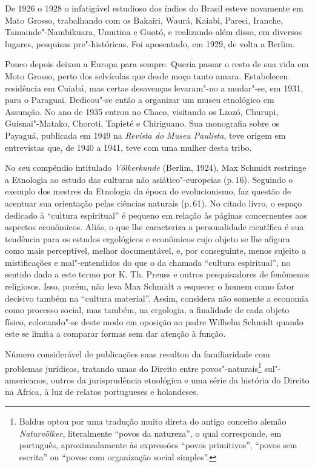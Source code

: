 {De 1926 o 1928 o infatigável estudioso dos índios do Brasil esteve
novamente em Mato Grosso, trabalhando com os Bakairi, Waurá, Kaiabi,
Pareci, Iranche, Tamainde"-Nambikuara, Umutina e Guotó, e realizando além
disso, em diversos lugares, pesquisas pre"-históricas. Foi aposentado, em
1929, de volta a Berlim.

Pouco depois deixou a Europa para sempre. Queria passar o resto de sua
vida em Moto Grosso, perto dos selvícolas que desde moço tanto amara.
Estabeleceu residência em Cuiabá, mas certas desavenças levaram"-no a
mudar"-se, em 1931, para o Paraguai. Dedicou"-se então a organizar um
museu etnológico em Assunção. No ano de 1935 entrou no Chaco, visitando
os Lzozó, Churupi, Guisnai"-Matako, Choroti, Tapieté e Chiriguano. Sua
monografia sobre os Payaguá, publicada em 1949 na \textit{Revista do Museu
Paulista}, teve origem em entrevistas que, de 1940 a 1941, teve com uma
mulher desta tribo.


No seu compêndio intitulado \textit{Völkerkunde} (Berlim, 1924), Max
Schmidt restringe a Etnologia ao estudo das culturas não
asiático"-europeias (p.\,16). Seguindo o exemplo dos mestres da Etnologia
da época do evolucionismo, faz questão de acentuar sua orientação pelas
ciências naturais (p.\,61). No citado livro, o espaço dedicado à
``cultura espiritual'' é pequeno em relação às páginas concernentes aos
aspectos econômicos. Aliás, o que lhe caracteriza a personalidade
científica é sua tendência para os estudos ergológicos e econômicos cujo
objeto se lhe afigura como mais perceptível, melhor documentável, e, por
conseguinte, menos sujeito a mistificações e mal"-entendidos do que o da
chamada ``cultura espiritual'', no sentido dado a este termo por K. Th.
Preuss e outros pesquisadores de fenômenos religiosos. Isso, porém, não
leva Max Schmidt a esquecer o homem como fator decisivo também na
``cultura material''. Assim, considera não somente a economia como
processo social, mas também, na ergologia, a finalidade de cada objeto
físico, colocando"-se deste modo em oposição ao padre Wilhelm Schmidt
quando este se limita a comparar formas sem dar atenção à função.

Número considerável de publicações suas resultou da familiaridade com
problemas jurídicos, tratando umas do Direito entre
povos"-naturais\footnote{Baldus optou por uma tradução muito direta do
  antigo conceito alemão \textit{Naturvölker}, literalmente ``povos da
  natureza'', o qual corresponde, em português, aproximadamente às
  expressões ``povos primitivos'', ``povos sem escrita'' ou ``povos com
  organização social simples''.} sul"-americanos, outros da jurisprudência
etnológica e uma série da história do Direito na Africa, à luz de
relatos portugueses e holandeses.

}
